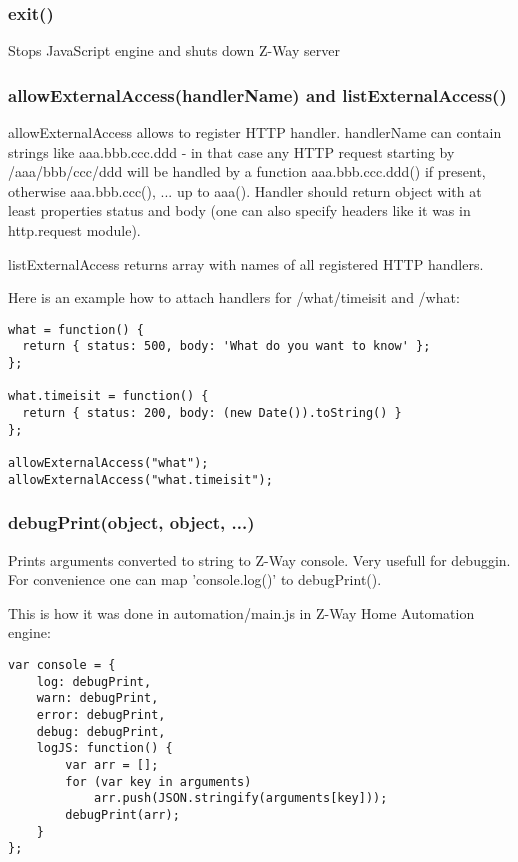 \subsubsection{exit()}
Stops JavaScript engine and shuts down Z-Way server


\subsubsection{allowExternalAccess(handlerName) and listExternalAccess()}
allowExternalAccess allows to register HTTP handler. handlerName can contain strings like aaa.bbb.ccc.ddd - in that case any HTTP request starting by /aaa/bbb/ccc/ddd will be handled by a function aaa.bbb.ccc.ddd() if present, otherwise aaa.bbb.ccc(), ... up to aaa().
Handler should return object with at least properties status and body (one can also specify headers like it was in http.request module).

listExternalAccess returns array with names of all registered HTTP handlers.

Here is an example how to attach handlers for /what/timeisit and /what:

\begin{lstlisting}
what = function() {
  return { status: 500, body: 'What do you want to know' };
};

what.timeisit = function() {
  return { status: 200, body: (new Date()).toString() }
};

allowExternalAccess("what");
allowExternalAccess("what.timeisit");
\end{lstlisting}

\subsubsection{debugPrint(object, object, ...)}

Prints arguments converted to string to Z-Way console. Very usefull for debuggin.
For convenience one can map 'console.log()' to debugPrint().

This is how it was done in automation/main.js in Z-Way Home Automation engine:
\begin{lstlisting}
var console = {
    log: debugPrint,
    warn: debugPrint,
    error: debugPrint,
    debug: debugPrint,
    logJS: function() {
        var arr = [];
        for (var key in arguments)
            arr.push(JSON.stringify(arguments[key]));
        debugPrint(arr);
    }
};
\end{lstlisting}

